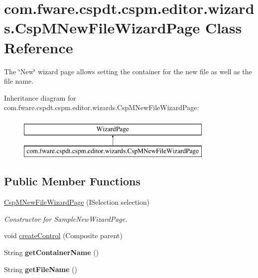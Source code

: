 \hypertarget{classcom_1_1fware_1_1cspdt_1_1cspm_1_1editor_1_1wizards_1_1_csp_m_new_file_wizard_page}{}\section{com.\+fware.\+cspdt.\+cspm.\+editor.\+wizards.\+Csp\+M\+New\+File\+Wizard\+Page Class Reference}
\label{classcom_1_1fware_1_1cspdt_1_1cspm_1_1editor_1_1wizards_1_1_csp_m_new_file_wizard_page}


The \char`\"{}\+New\char`\"{} wizard page allows setting the container for the new file as well as the file name.  


Inheritance diagram for com.\+fware.\+cspdt.\+cspm.\+editor.\+wizards.\+Csp\+M\+New\+File\+Wizard\+Page\+:\begin{figure}[H]
\begin{center}
\leavevmode
\includegraphics[height=2.000000cm]{classcom_1_1fware_1_1cspdt_1_1cspm_1_1editor_1_1wizards_1_1_csp_m_new_file_wizard_page}
\end{center}
\end{figure}
\subsection*{Public Member Functions}
\begin{DoxyCompactItemize}
\item 
\hyperlink{classcom_1_1fware_1_1cspdt_1_1cspm_1_1editor_1_1wizards_1_1_csp_m_new_file_wizard_page_a66def179890d0335a2d5d32b31610671}{Csp\+M\+New\+File\+Wizard\+Page} (I\+Selection selection)
\begin{DoxyCompactList}\small\item\em Constructor for Sample\+New\+Wizard\+Page. \end{DoxyCompactList}\item 
void \hyperlink{classcom_1_1fware_1_1cspdt_1_1cspm_1_1editor_1_1wizards_1_1_csp_m_new_file_wizard_page_aa939ca61b6f54c5d7f3d5fb942024bd9}{create\+Control} (Composite parent)
\item 
\mbox{\label{classcom_1_1fware_1_1cspdt_1_1cspm_1_1editor_1_1wizards_1_1_csp_m_new_file_wizard_page_a64294274b04d6502812fef2a0580933f}} 
String {\bfseries get\+Container\+Name} ()
\item 
\mbox{\label{classcom_1_1fware_1_1cspdt_1_1cspm_1_1editor_1_1wizards_1_1_csp_m_new_file_wizard_page_ab61044fb8c9ea7c8097fdef4ef5e4ff7}} 
String {\bfseries get\+File\+Name} ()
\end{DoxyCompactItemize}



